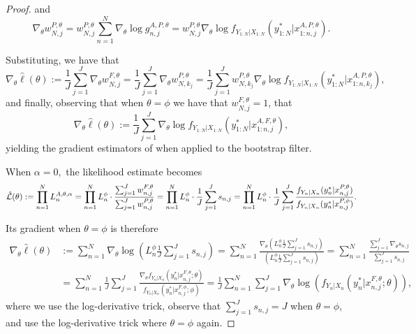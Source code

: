 \documentclass{article}
\begin{document}
\begin{proof}
and 
$$\nabla_\theta w_{N,j}^{P,\theta} = w_{N,j}^{P,\theta} \sum_{n=1}^N \nabla_\theta \log g_{n,j}^{A,P,\theta} = w_{N,j}^{P,\theta} \nabla_\theta \log f_{Y_{1:N}|X_{1:N}}\left(y_{1:N}^* | x_{1:n,j}^{A, P,\theta}\right).$$

Substituting, we have that
\begin{equation*}
    \nabla_\theta \hat{\ell}(\theta) := \frac{1}{J}\sum_{j=1}^J \nabla_\theta w_{N,j}^{F,\theta} =\frac{1}{J}\sum_{j=1}^J \nabla_\theta w_{N,k_j}^{P,\theta} = \frac{1}{J}\sum_{j=1}^J w_{N,k_j}^{P,\theta} \nabla_\theta \log f_{Y_{1:N}|X_{1:N}}\left(y_{1:N}^* | x_{1:n,k_j}^{A, P,\theta}\right),
\end{equation*}
and finally, observing that when $\theta=\phi$ we have that $w_{N,j}^{F,\theta}=1$, that 
\begin{equation*}
    \nabla_\theta \hat{\ell}(\theta) := \frac{1}{J}\sum_{j=1}^J \nabla_\theta \log f_{Y_{1:N}|X_{1:N}}\left(y_{1:N}^* | x_{1:n,j}^{A, F,\theta}\right),
\end{equation*}
yielding the gradient estimators of \cite{poyiadjis11, scibior2021dpf} when applied to the bootstrap filter. 

    When $\alpha=0,$ the likelihood estimate becomes
\begin{equation}
    \hat{\mathcal{L}}(\theta) := \prod_{n=1}^N L_n^{A, \theta, \alpha} = \prod_{n=1}^N L_n^\phi \cdot \frac{\sum_{j=1}^J w_{n,j}^{F,\theta}}{\sum_{j=1}^J w_{n,j}^{P,\theta}} = \prod_{n=1}^N L_n^\phi \cdot \frac{1}{J}\sum_{j=1}^J s_{n,j} = \prod_{n=1}^N L_n^\phi \cdot \frac{1}{J}\sum_{j=1}^J \frac{f_{Y_n|X_n}(y_n^*|x_{n,j}^{P, \theta})}{f_{Y_n|X_n}(y_n^*|x_{n,j}^{P, \phi})}.
\end{equation}

Its gradient when $\theta=\phi$ is therefore 
\begin{align*}
    \nabla_\theta \hat{\ell}(\theta) &:= \sum_{n=1}^N \nabla_\theta \log\left(L_n^\phi \frac{1}{J} \sum_{j=1}^J s_{n,j}\right) = \sum_{n=1}^N \frac{\nabla_\theta \left(L_n^\phi \frac{1}{J} \sum_{j=1}^J s_{n,j}\right)}{\left(L_n^\phi \frac{1}{J} \sum_{j=1}^J s_{n,j}\right)}= \sum_{n=1}^N \frac{\sum_{j=1}^J \nabla_\theta s_{n,j}}{\sum_{j=1}^J s_{n,j}} \\
    &= \sum_{n=1}^N \frac{1}{J} \sum_{j=1}^J \frac{\nabla_\theta f_{Y_n|X_{n}}(y_n^*|x_{n,j}^{F, \theta}; \theta)}{f_{Y_n|X_{n}}(y_n^*|x_{n,j}^{F, \phi}; \phi)} = \frac{1}{J} \sum_{n=1}^N \sum_{j=1}^J \nabla_\theta \log\left(f_{Y_n|X_{n}}(y_n^*|x_{n,j}^{F, \theta}; \theta)\right),
\end{align*}
where we use the log-derivative trick, observe that $\sum_{j=1}^J s_{n,j} = J$ when $\theta=\phi$, and use the log-derivative trick where $\theta=\phi$ again. 
\end{proof}
\end{document}
